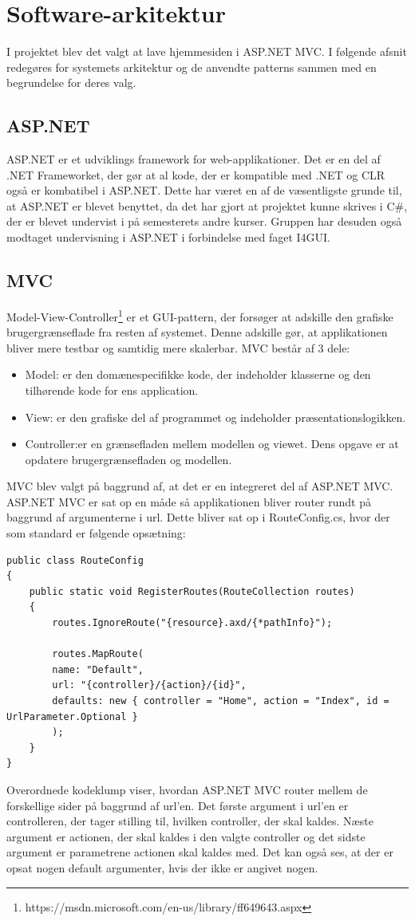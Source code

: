 \chapter{Software-arkitektur}

I projektet blev det valgt at lave hjemmesiden i ASP.NET MVC. I følgende afsnit redegøres for systemets arkitektur og de anvendte patterns sammen med en begrundelse for deres valg.

\section{ASP.NET}
ASP.NET er et udviklings framework for web-applikationer.
Det er en del af .NET Frameworket, der gør at al kode, der er  kompatible med .NET og CLR også er kombatibel i ASP.NET. Dette har været en af de væsentligste grunde til, at ASP.NET er blevet benyttet, da det har gjort at projektet kunne skrives i C\#, der er blevet undervist i på semesterets andre kurser. Gruppen har desuden også modtaget undervisning i ASP.NET i forbindelse med faget I4GUI.

\section{MVC}
Model-View-Controller\footnote{https://msdn.microsoft.com/en-us/library/ff649643.aspx} er et GUI-pattern, der forsøger at adskille den grafiske brugergrænseflade fra resten af systemet. Denne adskille gør, at applikationen bliver mere testbar og samtidig mere skalerbar.
MVC består af 3 dele:
\begin{itemize}
	\item Model: er den domænespecifikke kode, der indeholder klasserne og den tilhørende kode for ens application.
	\item View: er den grafiske del af programmet og indeholder præsentationslogikken.
	\item Controller:er en grænsefladen mellem modellen og viewet. Dens opgave er at opdatere brugergrænsefladen og modellen.
\end{itemize}

MVC blev valgt på baggrund af, at det er en integreret del af ASP.NET MVC. ASP.NET MVC er sat op en måde så applikationen bliver router rundt på baggrund af argumenterne i url.
Dette bliver sat op i RouteConfig.cs, hvor der som standard er følgende opsætning:
\begin{verbatim}
public class RouteConfig
{
	public static void RegisterRoutes(RouteCollection routes)
	{
		routes.IgnoreRoute("{resource}.axd/{*pathInfo}");
		
		routes.MapRoute(
		name: "Default",
		url: "{controller}/{action}/{id}",
		defaults: new { controller = "Home", action = "Index", id = UrlParameter.Optional }
		);
	}
}
\end{verbatim}
Overordnede kodeklump viser, hvordan ASP.NET MVC router mellem de forskellige sider på baggrund af url'en. Det første argument i url'en er controlleren, der tager stilling til, hvilken controller, der skal kaldes. Næste argument er actionen, der skal kaldes i den valgte controller og det sidste argument er parametrene actionen skal kaldes med.
Det kan også ses, at der er opsat nogen default argumenter, hvis der ikke er angivet nogen.

